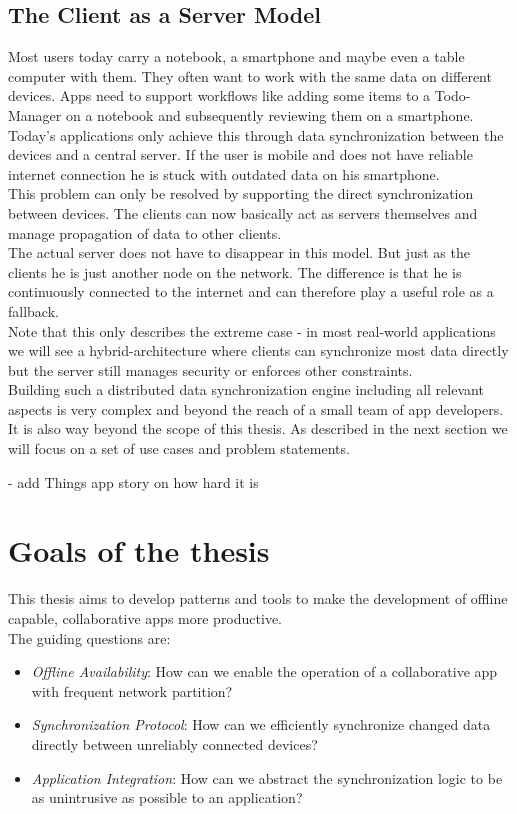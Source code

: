 \subsection{The Client as a Server Model}
Most users today carry a notebook, a smartphone and maybe even a table computer with them.
They often want to work with the same data on different devices.
Apps need to support workflows like adding some items to a Todo-Manager on a notebook and subsequently reviewing them on a smartphone.
Today's applications only achieve this through  data synchronization between the devices and a central server.
If the user is mobile and does not have reliable internet connection he is stuck with outdated data on his smartphone.\\
This problem can only be resolved by supporting the direct synchronization between devices.
The clients can now basically act as servers themselves and manage propagation of data to other clients.\\
The actual server does not have to disappear in this model.
But just as the clients he is just another node on the network.
The difference is that he is continuously connected to the internet and can therefore play a useful role as a fallback.\\
Note that this only describes the extreme case - in most real-world applications we will see a hybrid-architecture where clients can synchronize most data directly but the server still manages security or enforces other constraints.\\
Building such a distributed data synchronization engine including all relevant aspects is very complex and beyond the reach of a small team of app developers.
It is also way beyond the scope of this thesis.
As described in the next section we will focus on a set of use cases and problem statements.

- add Things app story on how hard it is

\section{Goals of the thesis}
This thesis aims to develop patterns and tools to make the development of offline capable, collaborative apps more productive.\\

The guiding questions are:
\begin{itemize}
\item \emph{Offline Availability}: How can we enable the operation of a collaborative app with frequent network partition?
\item \emph{Synchronization Protocol}: How can we efficiently synchronize changed data directly between unreliably connected devices?
\item \emph{Application Integration}: How can we abstract the synchronization logic to be as unintrusive as possible to an application?\\
\end{itemize}

